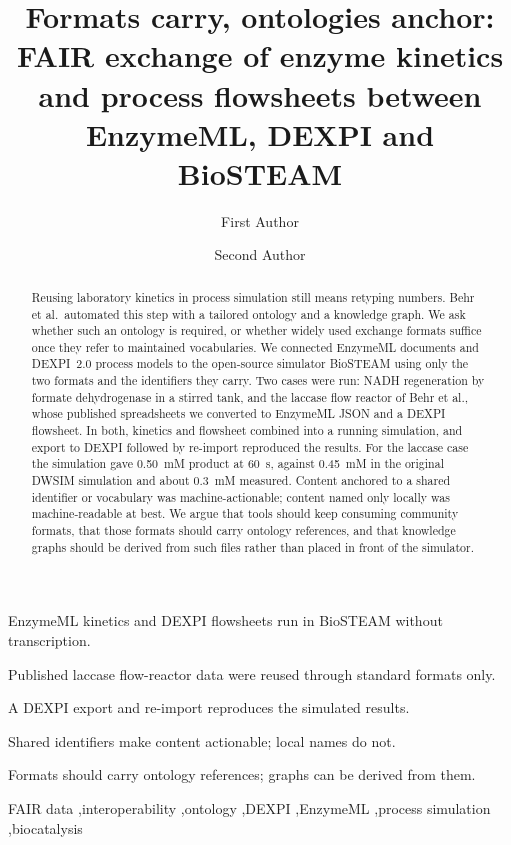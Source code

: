 \documentclass[preprint,12pt]{elsarticle}
\begin{document}
\begin{frontmatter}

\title{Formats carry, ontologies anchor: FAIR exchange of enzyme kinetics
and process flowsheets between EnzymeML, DEXPI and BioSTEAM}

\author[inst1]{First Author}
\author[inst1]{Second Author}

\begin{abstract}
Reusing laboratory kinetics in process simulation still means retyping
numbers. Behr et al.\ automated this step with a tailored ontology and a
knowledge graph. We ask whether such an ontology is required, or whether
widely used exchange formats suffice once they refer to maintained
vocabularies. We connected EnzymeML documents and DEXPI~2.0 process models
to the open-source simulator BioSTEAM using only the two formats and the
identifiers they carry. Two cases were run: NADH regeneration by formate
dehydrogenase in a stirred tank, and the laccase flow reactor of Behr et
al., whose published spreadsheets we converted to EnzymeML JSON and a DEXPI
flowsheet. In both, kinetics and flowsheet combined into a running
simulation, and export to DEXPI followed by re-import reproduced the
results. For the laccase case the simulation gave 0.50~mM product at 60~s,
against 0.45~mM in the original DWSIM simulation and about 0.3~mM measured.
Content anchored to a shared identifier or vocabulary was
machine-actionable; content named only locally was machine-readable at
best. We argue that tools should keep consuming community formats, that
those formats should carry ontology references, and that knowledge graphs
should be derived from such files rather than placed in front of the
simulator.
\end{abstract}

\begin{highlights}
\item EnzymeML kinetics and DEXPI flowsheets run in BioSTEAM without
      transcription.
\item Published laccase flow-reactor data were reused through standard
      formats only.
\item A DEXPI export and re-import reproduces the simulated results.
\item Shared identifiers make content actionable; local names do not.
\item Formats should carry ontology references; graphs can be derived from
      them.
\end{highlights}

\begin{keyword}
FAIR data \sep interoperability \sep ontology \sep DEXPI \sep EnzymeML
\sep process simulation \sep biocatalysis
\end{keyword}

\end{frontmatter}
\end{document}
